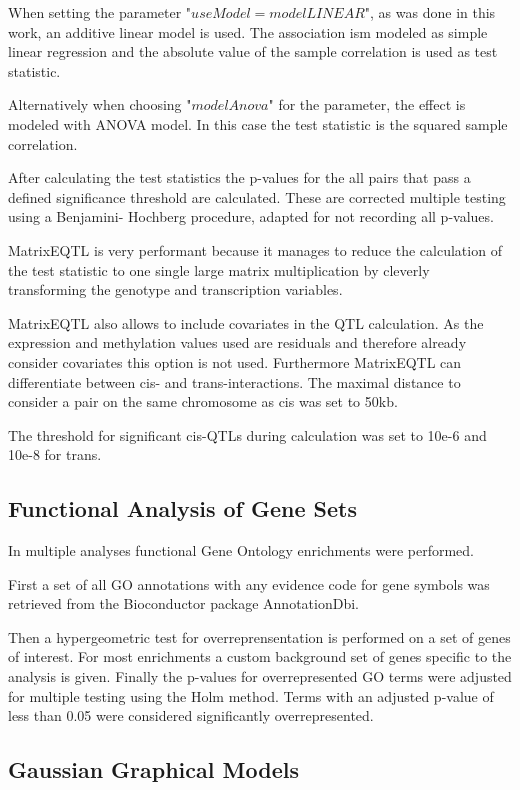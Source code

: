 \documentclass[a4paper,12pt]{article}
\begin{document}
When setting the parameter "$useModel = modelLINEAR$", as was done in this work, an additive linear model is used. The association ism modeled as simple linear regression and the absolute value of the sample correlation is used as test statistic.
 
Alternatively when choosing "$modelAnova$" for the parameter, the effect is modeled with ANOVA model. In this case the test statistic is the squared sample correlation.

After calculating the test statistics the p-values for the all pairs that pass a defined significance threshold are calculated. These are corrected multiple testing using a Benjamini- Hochberg procedure, adapted for not recording all p-values.

MatrixEQTL is very performant because it manages to reduce the calculation of the test statistic to one single large matrix multiplication by cleverly transforming the genotype and transcription variables.

MatrixEQTL also allows to include covariates in the QTL calculation. As the expression and methylation values used are residuals and therefore already consider covariates this option is not used. Furthermore MatrixEQTL can differentiate between cis- and trans-interactions. The maximal distance to consider a pair on the same chromosome as cis was set to 50kb. 

The threshold for significant cis-QTLs during calculation was set to 10e-6 and 10e-8 for trans.

\subsection{Functional Analysis of Gene Sets}
In multiple analyses functional Gene Ontology enrichments were performed.

First a set of all GO annotations with any evidence code for gene symbols  was retrieved from the Bioconductor package AnnotationDbi\cite{AnnotationDbi}. 

Then a hypergeometric test\cite{GOstats} for overreprensentation is performed on a set of genes of interest. For most enrichments a custom background set of genes specific to the analysis is given. Finally the p-values for overrepresented GO terms were adjusted for multiple testing using the Holm method\cite{10.2307/4615733}. Terms with an adjusted p-value of less than 0.05 were considered significantly overrepresented. 

\subsection{Gaussian Graphical Models}
\end{document}
